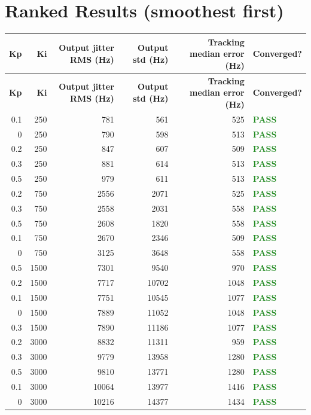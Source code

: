 \documentclass[11pt]{article}
\begin{document}
\section*{Ranked Results (smoothest first)}
\begin{longtable}{r r r r r l}
\hline
\textbf{Kp} & \textbf{Ki} & \textbf{Output jitter RMS (Hz)} & \textbf{Output std (Hz)} & \textbf{Tracking median error (Hz)} & \textbf{Converged?} \\
\hline
\endfirsthead
\hline
\textbf{Kp} & \textbf{Ki} & \textbf{Output jitter RMS (Hz)} & \textbf{Output std (Hz)} & \textbf{Tracking median error (Hz)} & \textbf{Converged?} \\
\hline
\endhead
0.1 & 250 & 781 & 561 & 525 & \textcolor{ForestGreen}{\textbf{PASS}} \\
0 & 250 & 790 & 598 & 513 & \textcolor{ForestGreen}{\textbf{PASS}} \\
0.2 & 250 & 847 & 607 & 509 & \textcolor{ForestGreen}{\textbf{PASS}} \\
0.3 & 250 & 881 & 614 & 513 & \textcolor{ForestGreen}{\textbf{PASS}} \\
0.5 & 250 & 979 & 611 & 513 & \textcolor{ForestGreen}{\textbf{PASS}} \\
0.2 & 750 & 2556 & 2071 & 525 & \textcolor{ForestGreen}{\textbf{PASS}} \\
0.3 & 750 & 2558 & 2031 & 558 & \textcolor{ForestGreen}{\textbf{PASS}} \\
0.5 & 750 & 2608 & 1820 & 558 & \textcolor{ForestGreen}{\textbf{PASS}} \\
0.1 & 750 & 2670 & 2346 & 509 & \textcolor{ForestGreen}{\textbf{PASS}} \\
0 & 750 & 3125 & 3648 & 558 & \textcolor{ForestGreen}{\textbf{PASS}} \\
0.5 & 1500 & 7301 & 9540 & 970 & \textcolor{ForestGreen}{\textbf{PASS}} \\
0.2 & 1500 & 7717 & 10702 & 1048 & \textcolor{ForestGreen}{\textbf{PASS}} \\
0.1 & 1500 & 7751 & 10545 & 1077 & \textcolor{ForestGreen}{\textbf{PASS}} \\
0 & 1500 & 7889 & 11052 & 1048 & \textcolor{ForestGreen}{\textbf{PASS}} \\
0.3 & 1500 & 7890 & 11186 & 1077 & \textcolor{ForestGreen}{\textbf{PASS}} \\
0.2 & 3000 & 8832 & 11311 & 959 & \textcolor{ForestGreen}{\textbf{PASS}} \\
0.3 & 3000 & 9779 & 13958 & 1280 & \textcolor{ForestGreen}{\textbf{PASS}} \\
0.5 & 3000 & 9810 & 13771 & 1280 & \textcolor{ForestGreen}{\textbf{PASS}} \\
0.1 & 3000 & 10064 & 13977 & 1416 & \textcolor{ForestGreen}{\textbf{PASS}} \\
0 & 3000 & 10216 & 14377 & 1434 & \textcolor{ForestGreen}{\textbf{PASS}} \\
\hline
\end{longtable}
\end{document}
